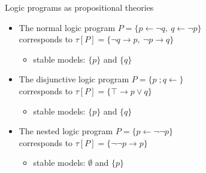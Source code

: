 \begin{frame}[c]{Logic programs as propositional theories}
  \begin{itemize}
  \item<1->
    The normal logic program
    \(
    P
    =
    \{
    p \leftarrow {\neg q}, \
    q \leftarrow {\neg p}
    \}
    \)\\
    corresponds to
    \(
    \tau[P]
    =
    \{
    {\neg q}\rightarrow p, \
    {\neg p}\rightarrow q
    \}
    \)
    \begin{itemize}
    \item<2-> stable models: $\{p\}$ and $\{q\}$
    \end{itemize}
    \medskip
  \item<3->
    The disjunctive logic program
    \(
    P
    =
    \{
    p\;;q \leftarrow
    \}
    \)\\
    corresponds to
    \(
    \tau[P]
    =
    \{
    \top \rightarrow p\vee q
    \}
    \)
    \begin{itemize}
    \item<4-> stable models: $\{p\}$ and $\{q\}$
    \end{itemize}
    \medskip
  \item<5->
    The nested logic program
    \(
    P
    =
    \{
    p \leftarrow {\neg {\neg p}}
    \}
    \)\\
    corresponds to
    \(
    \tau[P]
    =
    \{
    {\neg {\neg p}}\rightarrow p
    \}
    \)
    \begin{itemize}
    \item<6-> stable models: $\emptyset$ and $\{p\}$
    \end{itemize}
  \end{itemize}
\end{frame}
%
